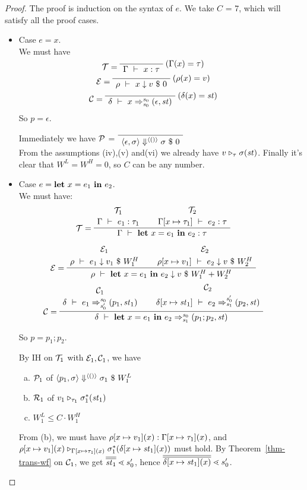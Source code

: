 \begin{proof}
	
The proof is induction on the syntax of $e$.
We take $C$ = 7, which will satisfy all the proof cases.
	
	\begin{itemize}
	
\item Case $e = x$.\\
We must have 
$$\MT = \PT{
	\AxiomC{}
	\RiLa{(\Gam(x) = \tau)}
	\UC{\Type{\Gam}{x}{\tau}}
}$$
$$ \ME = 
\PT{
	\AxiomC{}
	\RiLa{(\rho(x)=v)}
	\UC{\Eval{\rho}{x}{v}{0}}
}$$
$$ \MC = 
\PT{\AC{}
	\RiLa{(\del(x)= \st)}
	\UC{\Trans{\del}{x}{\s_0}{\s_0}{\sfun{\epsilon}{\st}}}}
$$
So $p= \epsilon$. 

Immediately we have $\mathcal{P}$ =
$\PT{\Axiom{\seval{\epsilon}{\sgm}{\vunit}{\sgm}{0}}}$\\
From the assumptions (iv),(v) and(vi) we already have $v \mathrel{\triangleright_{\tau}} \sigma(\mathit{st})$.
Finally it's clear that $W^L = W^H = 0$, so $C$ can be any number. 


\item \label{case-let} Case $e = \mathbf{let} \ x = e_1 \ \mathbf{in} \ e_2$. \\[1ex]
We must have:
$$\PT{
	\UCN{\MT_1}{\Type{\Gam}{e_1}{\tau_1}}
	\UCN{\MT_2}{\Type{\Gam[\Map{x}{\tau_1}]}{e_2}{\tau}}
	\LeLa{\MT =} 
	\BC{\Type{\Gam}{\Let{x}{e_1}{e_2}}{\tau}}
}$$

$$\PT{	
	\UCN{\ME_1}{\Eval{\rho}{e_1}{v_1}{W^H_1}}
	\UCN{\ME_2}{\Eval{\rho[\Map{x}{v_1}]}{e_2}{v}{W^H_2}}
	\LeLa{\ME =} 
	\BC{\Eval{\rho}{\Let{x}{e_1}{e_2}}{v}{W^H_1+W^H_2}}
}$$ 
$$\PT{\UCN{\MC_1}{\Trans{\del}{e_1}{\s_0}{\s_0'}{\sfun{p_1}{\st_1}}}
	\UCN{\MC_2}{\Trans{\del[x \|-> {\st_1}]}{e_2}{\s_0'}{\s_1}{\sfun {p_2} {\st}}}
	\LeLa{\MC = }
	\BC{\Trans{\del}{\Let{x}{e_1}{e_2}}{\s_0}{\s_1}{\sfun {p_1;p_2} {\st}}}
}$$

So $p = p_1;p_2$. 

By IH on $\mathcal{T}_1$ with $\mathcal{E}_1,\mathcal{C}_1$, we have
\begin{enumerate}[(a)]
	\item $\mathcal{P}_1$ of $\left\langle p_1,\sigma \right\rangle \Downarrow^{\langle () \rangle} \sigma_1 \ \$ \ W^L_1$
	\item $\mathcal{R}_1$ of $v_1 \mathrel{\triangleright_{\tau_1}} \sigma_1^*(\mathit{st}_1)$
    \item $W^L_1 \le C \cdot W^H_1 $ 
\end{enumerate}

From (b), we must have $\rho[x \mapsto v_1](x) : \Gamma[x \mapsto \tau_1](x)$, and  $\rho[x \mapsto v_1](x) \mathrel{\triangleright_{\Gamma[x \mapsto \tau_1](x)}} \sigma_1^*(\delta[x \mapsto \mathit{st}_1](x))$ must hold. 
By Theorem~\ref{thm-trans-wf} on $\mathcal{C}_1$, 
we get $\olol{\st_1} \.< s_0'$, hence $\olol{\delta[\Map{x}{\st_1}](x)} \.< s_0'$. 


\end{itemize}
\end{proof}
